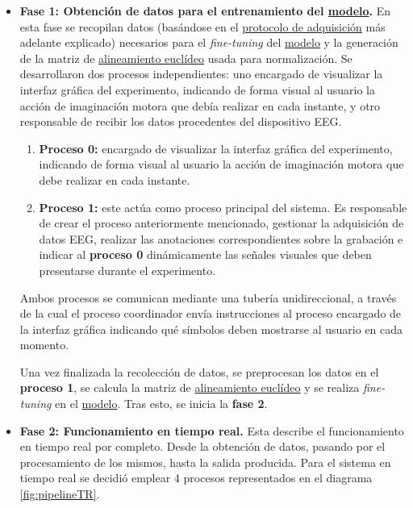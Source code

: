 \begin{itemize}
	\item \textbf{Fase 1: Obtención de datos para el entrenamiento del \hyperref[sec:modelo]{modelo}.} En esta fase se recopilan datos (basándose en el \hyperref[sec:protocoloAdquisicion]{protocolo de adquisición} más adelante explicado) necesarios para el \textit{fine-tuning} del \hyperref[sec:modelo]{modelo} y la generación de la matriz de \hyperref[subsec:alineamiento_euclideo]{alineamiento euclídeo} usada para normalización. Se desarrollaron dos procesos independientes: uno encargado de visualizar la interfaz gráfica del experimento, indicando de forma visual al usuario la acción de imaginación motora que debía realizar en cada instante, y otro responsable de recibir los datos procedentes del dispositivo EEG.
	
	\begin{enumerate}
		\item \textbf{Proceso 0:} encargado de visualizar la interfaz gráfica del experimento, indicando de forma visual al usuario la acción de imaginación motora que debe realizar en cada instante.
		\item \textbf{Proceso 1:} este actúa como proceso principal del sistema. Es responsable de crear el proceso anteriormente mencionado, gestionar la adquisición de datos EEG, realizar las anotaciones correspondientes sobre la grabación e indicar al \textbf{proceso 0} dinámicamente las señales visuales que deben presentarse durante el experimento.
	\end{enumerate}

	Ambos procesos se comunican mediante una tubería unidireccional, a través de la cual el proceso coordinador envía instrucciones al proceso encargado de la interfaz gráfica indicando qué símbolos deben mostrarse al usuario en cada momento.

	Una vez finalizada la recolección de datos, se preprocesan los datos en el \textbf{proceso 1}, se calcula la matriz de \hyperref[subsec:alineamiento_euclideo]{alineamiento euclídeo} y se realiza \textit{fine-tuning} en el \hyperref[sec:modelo]{modelo}. Tras esto, se inicia la \textbf{fase 2}. 

	\item \textbf{Fase 2: Funcionamiento en tiempo real.} Esta describe el funcionamiento en tiempo real por completo. Desde la obtención de datos, pasando por el procesamiento de los mismos, hasta la salida producida. Para el sistema en tiempo real se decidió emplear 4 procesos representados en el diagrama \ref{fig:pipelineTR}.
	

\end{itemize}
